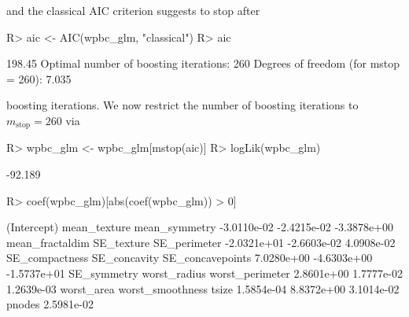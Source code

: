 \documentclass{article}
\newcommand{\Robject}[1]{\texttt{#1}}
\newenvironment{Schunk}{}{}
\begin{document}
and the classical AIC criterion suggests to stop after
\begin{Schunk}
\begin{Sinput}
R> aic <- AIC(wpbc_glm, "classical")
R> aic
\end{Sinput}
\begin{Soutput}
[1] 198.45
Optimal number of boosting iterations: 260 
Degrees of freedom (for mstop = 260): 7.035 
\end{Soutput}
\end{Schunk}
boosting iterations. 
We now restrict the number of boosting iterations to 
$m_\text{stop} = 260$ via
\begin{Schunk}
\begin{Sinput}
R> wpbc_glm <- wpbc_glm[mstop(aic)]
R> logLik(wpbc_glm)
\end{Sinput}
\begin{Soutput}
[1] -92.189
\end{Soutput}
\begin{Sinput}
R> coef(wpbc_glm)[abs(coef(wpbc_glm)) > 0]
\end{Sinput}
\begin{Soutput}
     (Intercept)     mean_texture    mean_symmetry 
     -3.0110e-02      -2.4215e-02      -3.3878e+00 
 mean_fractaldim       SE_texture     SE_perimeter 
     -2.0321e+01      -2.6603e-02       4.0908e-02 
  SE_compactness     SE_concavity SE_concavepoints 
      7.0280e+00      -4.6303e+00      -1.5737e+01 
     SE_symmetry     worst_radius  worst_perimeter 
      2.8601e+00       1.7777e-02       1.2639e-03 
      worst_area worst_smoothness            tsize 
      1.5854e-04       8.8372e+00       3.1014e-02 
          pnodes 
      2.5981e-02 
\end{Soutput}
\end{Schunk}
\end{document}
